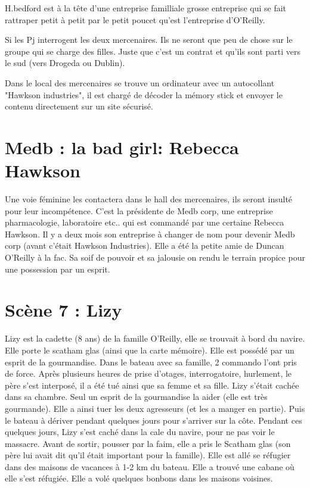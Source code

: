 \documentclass[oneside,12pt]{book}
\begin{document}
\begin{flushleft}
H.bedford est à la tête d'une entreprise familliale grosse entreprise qui se fait rattraper petit à petit par le petit poucet qu'est l'entreprise d'O'Reilly.

Si les Pj interrogent les deux mercenaires. Ils ne seront que peu de chose sur le groupe qui se charge des filles. Juste que c'est un contrat et qu'ils sont parti vers le sud (vers Drogeda ou Dublin).

Dans le local des mercenaires se trouve un ordinateur avec un autocollant "Hawkson industries", il est chargé de décoder la mémory stick et envoyer le contenu directement sur un site sécurisé. 



\section{Medb : la bad girl: Rebecca Hawkson}
Une voie féminine les contactera dans le hall des mercenaires, ils seront insulté pour leur incompétence. 
C'est la présidente de Medb corp, une entreprise pharmacologie, laboratoire etc.. qui est commandé par une certaine Rebecca Hawkson. Il y a deux mois son entreprise à changer de nom pour devenir Medb corp (avant c'était Hawkson Industries). Elle a été la petite amie de Duncan O'Reilly à la fac. 
Sa soif de pouvoir et sa jalousie on rendu le terrain propice pour une possession par un esprit.    

\section{Scène 7 : Lizy}
Lizy est la cadette (8 ans) de la famille O'Reilly, elle se trouvait à bord du navire. Elle porte le scatham glas (ainsi que la carte mémoire). Elle est possédé par un 
esprit de la gourmandise. 
Dans le bateau avec sa famille, 2 commando l'ont pris de force. Après plusieurs heures de prise d'otages, interrogatoire, hurlement, le père s'est interposé, il a été tué ainsi que sa femme et sa fille. Lizy s'était cachée dans sa chambre. Seul un esprit de la gourmandise la aider (elle est très gourmande). Elle a ainsi tuer  les deux agresseurs (et les a manger en partie). 
Puis le bateau à dériver pendant quelques jours pour s'arriver sur la côte. Pendant ces quelques jours, Lizy s'est caché dans la cale du navire, pour ne pas voir le massacre. Avant de sortir, pousser par la faim, elle a pris le Scatham glas (son père lui avait dit qu'il était important pour la famille). Elle est allé se réfugier dans des maisons de vacances à 1-2 km du bateau. Elle a trouvé une cabane où elle s'est réfugiée.
Elle a volé quelques bonbons dans les maisons voisines. 


\end{flushleft}
\end{document}
